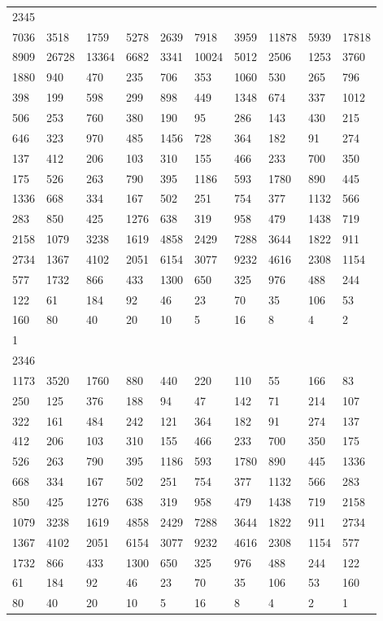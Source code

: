\begin{longtable}{*{10}{l}}
2345&&&&&&&&&\\
7036& 3518& 1759& 5278& 2639& 7918& 3959& 11878& 5939& 17818\\
8909& 26728& 13364& 6682& 3341& 10024& 5012& 2506& 1253& 3760\\
1880& 940& 470& 235& 706& 353& 1060& 530& 265& 796\\
398& 199& 598& 299& 898& 449& 1348& 674& 337& 1012\\
506& 253& 760& 380& 190& 95& 286& 143& 430& 215\\
646& 323& 970& 485& 1456& 728& 364& 182& 91& 274\\
137& 412& 206& 103& 310& 155& 466& 233& 700& 350\\
175& 526& 263& 790& 395& 1186& 593& 1780& 890& 445\\
1336& 668& 334& 167& 502& 251& 754& 377& 1132& 566\\
283& 850& 425& 1276& 638& 319& 958& 479& 1438& 719\\
2158& 1079& 3238& 1619& 4858& 2429& 7288& 3644& 1822& 911\\
2734& 1367& 4102& 2051& 6154& 3077& 9232& 4616& 2308& 1154\\
577& 1732& 866& 433& 1300& 650& 325& 976& 488& 244\\
122& 61& 184& 92& 46& 23& 70& 35& 106& 53\\
160& 80& 40& 20& 10& 5& 16& 8& 4& 2\\
1& \\

2346&&&&&&&&&\\
1173& 3520& 1760& 880& 440& 220& 110& 55& 166& 83\\
250& 125& 376& 188& 94& 47& 142& 71& 214& 107\\
322& 161& 484& 242& 121& 364& 182& 91& 274& 137\\
412& 206& 103& 310& 155& 466& 233& 700& 350& 175\\
526& 263& 790& 395& 1186& 593& 1780& 890& 445& 1336\\
668& 334& 167& 502& 251& 754& 377& 1132& 566& 283\\
850& 425& 1276& 638& 319& 958& 479& 1438& 719& 2158\\
1079& 3238& 1619& 4858& 2429& 7288& 3644& 1822& 911& 2734\\
1367& 4102& 2051& 6154& 3077& 9232& 4616& 2308& 1154& 577\\
1732& 866& 433& 1300& 650& 325& 976& 488& 244& 122\\
61& 184& 92& 46& 23& 70& 35& 106& 53& 160\\
80& 40& 20& 10& 5& 16& 8& 4& 2& 1\\


\end{longtable}
